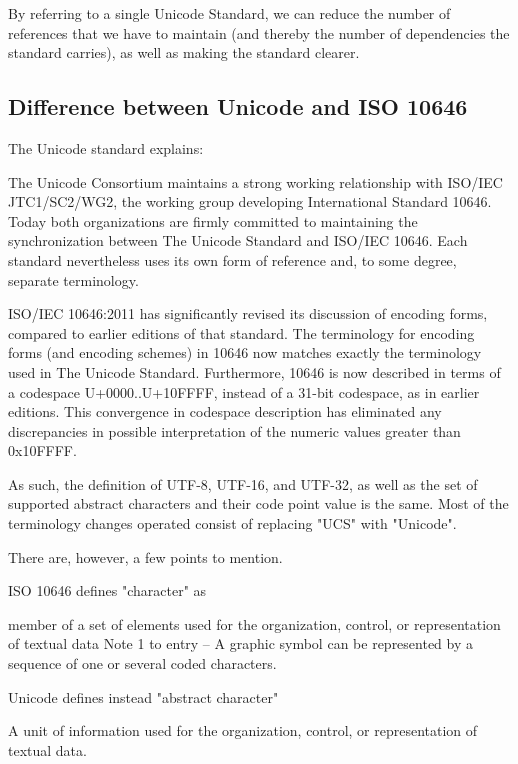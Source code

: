 \documentclass{wg21}
\begin{document}
By referring to a single Unicode Standard, we can reduce the number of references
that we have to maintain (and thereby the number of dependencies the standard carries),
as well as making the standard clearer.

\subsection{Difference between Unicode and ISO 10646}

The Unicode standard explains:

\begin{quoteblock}
The Unicode Consortium maintains a strong working relationship with ISO/IEC
JTC1/SC2/WG2, the working group developing International Standard 10646. Today both
organizations are firmly committed to maintaining the synchronization between The Unicode Standard and ISO/IEC 10646. Each standard nevertheless uses its own form of reference and, to some degree, separate terminology.
\end{quoteblock}

\begin{quoteblock}
ISO/IEC 10646:2011 has significantly revised its discussion of encoding forms, compared
to earlier editions of that standard. The terminology for encoding forms (and encoding
schemes) in 10646 now matches exactly the terminology used in The Unicode Standard.
Furthermore, 10646 is now described in terms of a codespace U+0000..U+10FFFF, instead
of a 31-bit codespace, as in earlier editions. This convergence in codespace description has
eliminated any discrepancies in possible interpretation of the numeric values greater than
0x10FFFF.
\end{quoteblock}

As such, the definition of UTF-8, UTF-16, and UTF-32, as well as the set of supported abstract characters and their code point value is the same.
Most of the terminology changes operated consist of replacing "UCS" with "Unicode".

There are, however, a few points to mention.

ISO 10646 defines "character" as
\begin{quoteblock}
member of a set of elements used for the organization, control, or representation of textual data
Note 1 to entry – A graphic symbol can be represented by a sequence of one or several coded characters.
\end{quoteblock}

Unicode defines instead "abstract character"
\begin{quoteblock}
A unit of information used for the organization, control, or representation of textual data.
\end{quoteblock}
\end{document}
